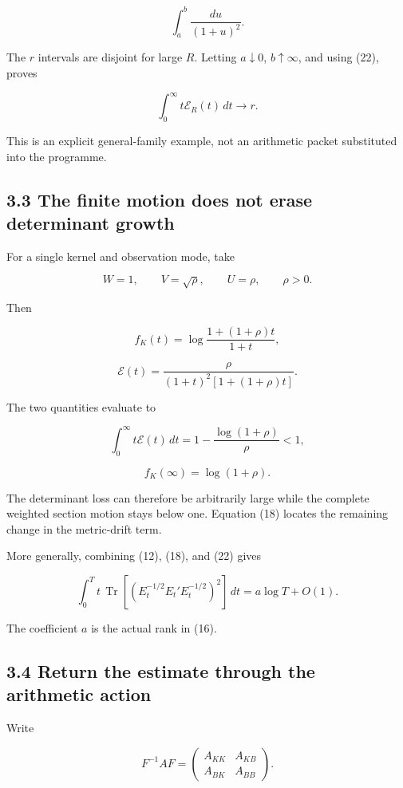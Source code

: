 \documentclass[11pt]{article}
\begin{document}
\[
\int_a^b\frac{du}{(1+u)^2}.
\]

The \(r\) intervals are disjoint for large \(R\). Letting \(a\downarrow0\), \(b\uparrow\infty\), and using (22), proves

\[
\boxed{
\int_0^\infty t\mathcal E_R(t)\,dt\longrightarrow r.
}
\tag{25}
\]

This is an explicit general-family example, not an arithmetic packet substituted into the programme.

\subsection{3.3 The finite motion does not erase determinant growth}\label{the-finite-motion-does-not-erase-determinant-growth}

For a single kernel and observation mode, take

\[
W=1,\qquad V=\sqrt\rho,\qquad U=\rho,\qquad \rho>0.
\]

Then

\[
f_K(t)
=
\log\frac{1+(1+\rho)t}{1+t},
\]

\[
\mathcal E(t)
=
\frac{\rho}{(1+t)^2[1+(1+\rho)t]}.
\]

The two quantities evaluate to

\[
\boxed{
\int_0^\infty t\mathcal E(t)\,dt
=
1-\frac{\log(1+\rho)}{\rho}<1,
}
\]

\[
\boxed{f_K(\infty)=\log(1+\rho).}
\tag{26}
\]

The determinant loss can therefore be arbitrarily large while the complete weighted section motion stays below one. Equation (18) locates the remaining change in the metric-drift term.

More generally, combining (12), (18), and (22) gives

\[
\int_0^Tt\,
\operatorname{Tr}
[(E_t^{-1/2}E_t'E_t^{-1/2})^2]\,dt
=
a\log T+O(1).
\tag{27}
\]

The coefficient \(a\) is the actual rank in (16).

\subsection{3.4 Return the estimate through the arithmetic action}\label{return-the-estimate-through-the-arithmetic-action}

Write

\[
F^{-1}AF=
\begin{pmatrix}
A_{KK}&A_{KB}\\
A_{BK}&A_{BB}
\end{pmatrix}.
\]
\end{document}
